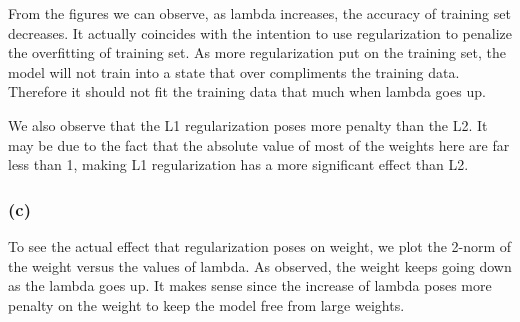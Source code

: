 \documentclass{article}
\begin{document}
From the figures we can observe, as lambda increases, the accuracy of training set decreases. It actually coincides with the intention to use regularization to penalize the overfitting of training set. As more regularization put on the training set, the model will not train into a state that over compliments the training data. Therefore it should not fit the training data that much when lambda goes up.

We also observe that the L1 regularization poses more penalty than the L2. It may be due to the fact that the absolute value of most of the weights here are far less than 1, making L1 regularization has a more significant effect than L2.
\subsubsection*{(c)}
To see the actual effect that regularization poses on weight, we plot the 2-norm of the weight versus the values of lambda. As observed, the weight keeps going down as the lambda goes up. It makes sense since the increase of lambda poses more penalty on the weight to keep the model free from large weights. 
\end{document}
